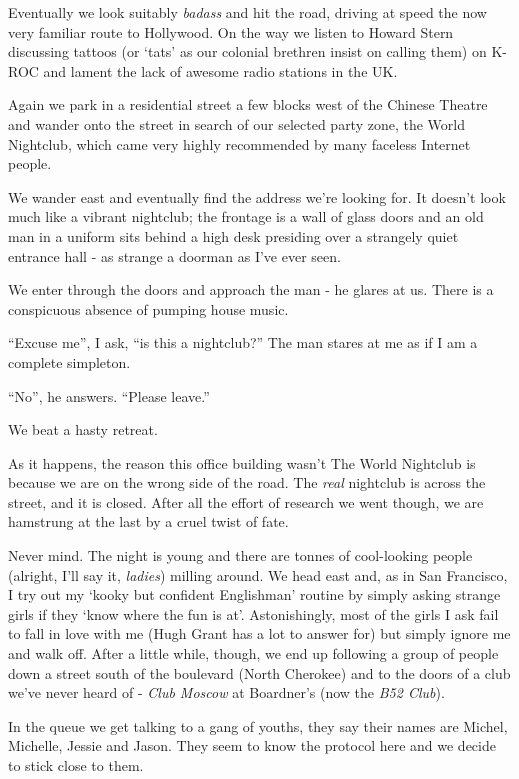 \documentclass[a5paper,titlepage,11pt]{book}
\begin{document}
Eventually we look suitably \emph{badass} and hit the road, driving at speed the now very familiar route to Hollywood.  On the way we listen to Howard Stern discussing tattoos (or `tats' as our colonial brethren insist on calling them) on K-ROC and lament the lack of awesome radio stations in the UK.

Again we park in a residential street a few blocks west of the Chinese Theatre and wander onto the street in search of our selected party zone, the World Nightclub, which came very highly recommended by many faceless Internet people.

We wander east and eventually find the address we're looking for.  It doesn't look much like a vibrant nightclub; the frontage is a wall of glass doors and an old man in a uniform sits behind a high desk presiding over a strangely quiet entrance hall - as strange a doorman as I've ever seen.

We enter through the doors and approach the man - he glares at us.  There is a conspicuous absence of pumping house music.

``Excuse me'', I ask, ``is this a nightclub?''  The man stares at me as if I am a complete simpleton.

``No'', he answers.  ``Please leave.''

We beat a hasty retreat.

As it happens, the reason this office building wasn't The World Nightclub is because we are on the wrong side of the road.  The \emph{real} nightclub is across the street, and it is closed.  After all the effort of research we went though, we are hamstrung at the last by a cruel twist of fate.

Never mind.  The night is young and there are tonnes of cool-looking people (alright, I'll say it, \emph{ladies}) milling around.  We head east and, as in San Francisco, I try out my `kooky but confident Englishman' routine by simply asking strange girls if they `know where the fun is at'.  Astonishingly, most of the girls I ask fail to fall in love with me (Hugh Grant has a lot to answer for) but simply ignore me and walk off.  After a little while, though, we end up following a group of people down a street south of the boulevard (North Cherokee) and to the doors of a club we've never heard of - \emph{Club Moscow} at Boardner's (now the \emph{B52 Club}).

In the queue we get talking to a gang of youths, they say their names are Michel, Michelle, Jessie and Jason.  They seem to know the protocol here and we decide to stick close to them.
\end{document}
